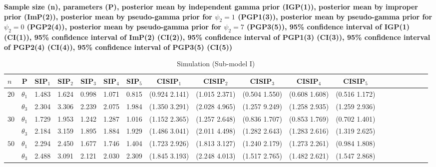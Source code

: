\documentclass[12pt]{article}    %
\numberwithin{equation}{section}
\begin{document}
			
			\begin{landscape}
				\begin{table}
					\caption{{ Simulation (Sub-model I)}} 
					\label{Table_sub_I}
					\normalsize
					\begin{tablenotes}
						\item {\bf Sample size (n), parameters (P), posterior mean by independent gamma prior (IGP(1)), posterior mean by improper prior (ImP(2)), posterior mean by pseudo-gamma prior for $\psi_2=1$ (PGP1(3)), posterior mean by pseudo-gamma prior for $\psi_2=0$ (PGP2(4)), posterior mean by pseudo-gamma prior for $\psi_2=7$ (PGP3(5)),  95\% confidence interval of IGP(1) (CI(1)), 95\% confidence interval of ImP(2) (CI(2)), 95\% confidence interval of PGP1(3) (CI(3)), 95\% confidence interval of PGP2(4) (CI(4)), 95\% confidence interval of PGP3(5) (CI(5))}
					\end{tablenotes}
					\centering %
					\begin{tabular}{lcccccccccccccccccr} %
						\toprule[\heavyrulewidth]\toprule[\heavyrulewidth]
						\textbf{$n$ }  & \textbf{P} & \textbf{SIP$_1$} & \textbf{SIP$_2$} & \textbf{SIP$_3$} & \textbf{SIP$_4$} &\textbf{SIP$_5$} & \textbf{CISIP$_1$} &  \textbf{CISIP$_2$}   &  \textbf{CISIP$_3$}   &   \textbf{CISIP$_4$} & \textbf{CISIP$_5$}   \\ 
						\midrule
						
						\multirow{2}{*}{$20$} & $\theta_1$ & 1.483 & 1.624 & 0.998 &  1.071 &  0.815  & (0.924 2.141) & (1.015 2.371) & (0.504 1.550) & (0.608 1.608) & (0.516 1.172) \\
						& $\theta_3$ & 2.304 & 3.306 & 2.239 &  2.075 &  1.984 &  (1.350 3.291) & (2.028 4.965) & (1.257 9.249) & (1.258 2.935) & (1.259 2.936)\\
						\bottomrule[\heavyrulewidth]    
						
						\multirow{2}{*}{$30$} & $\theta_1$ & 1.729 & 1.953 & 1.242 &  1.287 &  1.016 &  (1.152 2.365) & (1.257 2.648) & (0.836 1.707) & (0.853 1.769) & (0.702 1.401) \\
						& $\theta_3$ & 2.184 & 3.159 & 1.895 &  1.884 &  1.929 &  (1.486 3.041) & (2.011 4.498) & (1.282 2.643) & (1.283 2.616) & (1.319 2.625)\\
						\bottomrule[\heavyrulewidth]    
						
						\multirow{2}{*}{$50$} & $\theta_1$ & 2.294 & 2.450 & 1.677 &  1.746 &  1.404 &  (1.723 2.926) & (1.813 3.127) & (1.240 2.179) & (1.273 2.261) & (0.984 1.808) \\
						& $\theta_3$ & 2.488 & 3.091 & 2.121 &  2.030 &  2.309 &  (1.845 3.193) & (2.248 4.013) & (1.517 2.765) & (1.482 2.621) & (1.547 2.868)\\
						\bottomrule[\heavyrulewidth]    
						

\end{tabular}
\end{table}
\end{landscape}
\end{document}
